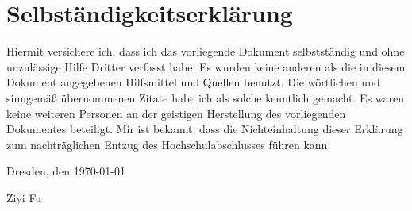  

\section*{\vfill{} \thispagestyle{empty}
Selbständigkeitserklärung}

Hiermit versichere ich, dass ich das vorliegende Dokument selbstständig und ohne unzulässige
Hilfe Dritter verfasst habe. Es wurden keine anderen als die in diesem Dokument angegebenen
Hilfsmittel und Quellen benutzt. Die wörtlichen und sinngemäß übernommenen Zitate habe ich 
als solche kenntlich gemacht. Es waren keine weiteren Personen an der geistigen Herstellung 
des vorliegenden Dokumentes beteiligt. Mir ist bekannt, dass die Nichteinhaltung dieser
Erklärung zum nachträglichen Entzug des Hochschulabschlusses führen kann.
\bigskip{}

\noindent Dresden, den \today %
\vspace{2.5cm}

\noindent Ziyi Fu {}
